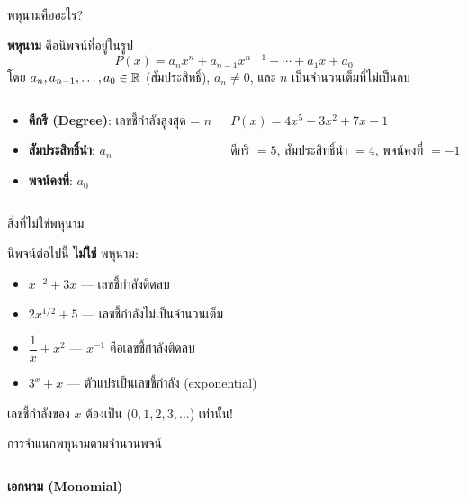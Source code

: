 \documentclass[11pt, aspectratio=169]{beamer}
\begin{document}
\begin{frame}{พหุนามคืออะไร?}
  \begin{explanation}
    \textbf{พหุนาม} คือนิพจน์ที่อยู่ในรูป
    \[
      P(x) = a_n x^n + a_{n-1} x^{n-1} + \cdots + a_1 x + a_0
    \]
    โดย $a_n, a_{n-1}, \ldots, a_0 \in \mathbb{R}$ (สัมประสิทธิ์), $a_n \neq 0$, และ $n$ เป็นจำนวนเต็มที่ไม่เป็นลบ
  \end{explanation}

  \begin{columns}[T]
      \begin{explanation}
        \begin{itemize}
          \item \textbf{ดีกรี (Degree)}: เลขชี้กำลังสูงสุด = $n$
          \item \textbf{สัมประสิทธิ์นำ}: $a_n$
          \item \textbf{พจน์คงที่}: $a_0$
        \end{itemize}
      \end{explanation}
      \begin{exambox}[ตัวอย่าง]
        $P(x) = 4x^5 - 3x^2 + 7x - 1$

        ดีกรี $= 5$, สัมประสิทธิ์นำ $= 4$, พจน์คงที่ $= -1$
      \end{exambox}
  \end{columns}
\end{frame}\begin{frame}{สิ่งที่ไม่ใช่พหุนาม}
  \begin{explanation}[ข้อควรระวัง]
    นิพจน์ต่อไปนี้ \textbf{ไม่ใช่} พหุนาม:
    \begin{itemize}
      \item $x^{-2} + 3x$ \quad — เลขชี้กำลังติดลบ
      \item $2x^{1/2} + 5$ \quad — เลขชี้กำลังไม่เป็นจำนวนเต็ม
      \item $\dfrac{1}{x} + x^2$ \quad — $x^{-1}$ คือเลขชี้กำลังติดลบ
      \item $3^x + x$ \quad — ตัวแปรเป็นเลขชี้กำลัง (exponential)
    \end{itemize}
  \end{explanation}

  \begin{intuition}[จำง่าย ๆ]
    เลขชี้กำลังของ $x$ ต้องเป็น  ($0, 1, 2, 3, \ldots$) เท่านั้น!
  \end{intuition}
\end{frame}\begin{frame}{การจำแนกพหุนามตามจำนวนพจน์}
  \begin{columns}[T]
      \centering
      \textbf{เอกนาม (Monomial)}


\end{columns}
\end{frame}
\end{document}
